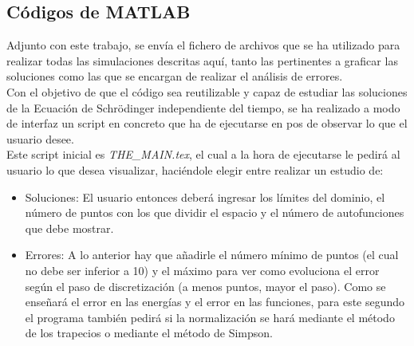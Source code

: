 \documentclass[12pt]{article}
\begin{document}
\subsection{Códigos de MATLAB}
Adjunto con este trabajo, se envía el fichero de archivos que se ha utilizado para realizar todas las simulaciones descritas aquí, tanto las pertinentes a graficar las soluciones como las que se encargan de realizar el análisis de errores.\\

Con el objetivo de que el código sea reutilizable y capaz de estudiar las soluciones de la Ecuación de Schrödinger independiente del tiempo, se ha realizado a modo de interfaz un script en concreto que ha de ejecutarse en pos de observar lo que el usuario desee.\\

Este script inicial es \textit{THE\_MAIN.tex}, el cual a la hora de ejecutarse le pedirá al usuario lo que desea visualizar, haciéndole elegir entre realizar un estudio de:

\begin{itemize}
    \item Soluciones: El usuario entonces deberá ingresar los límites del dominio, el número de puntos con los que dividir el espacio y el número de autofunciones que debe mostrar.

    \item Errores: A lo anterior hay que añadirle el número mínimo de puntos (el cual no debe ser inferior a 10) y el máximo para ver como evoluciona el error según el paso de discretización (a menos puntos, mayor el paso). Como se enseñará el error en las energías y el error en las funciones, para este segundo el programa también pedirá si la normalización se hará mediante el método de los trapecios o mediante el método de Simpson.

\end{itemize}
\end{document}
